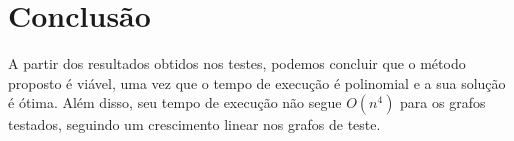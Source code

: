  
 
 




\section{\esp Conclusão}

A partir dos resultados obtidos nos testes, podemos concluir que o método proposto é viável, uma vez 
que o tempo de execução é polinomial e a sua solução é ótima. Além disso, seu tempo de execução
não segue $O(n^4)$ para os grafos testados, seguindo um crescimento linear nos grafos de teste.